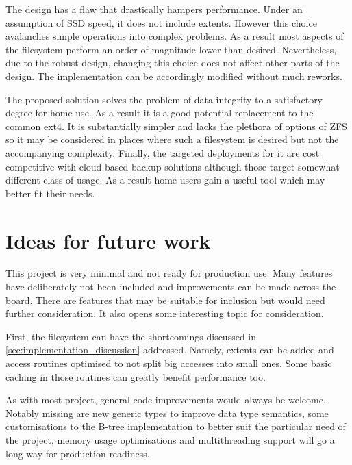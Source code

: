         The design has a flaw that drastically hampers performance. Under an
        assumption of SSD speed, it does not include extents. However this
        choice avalanches simple operations into complex problems. As a result
        most aspects of the filesystem perform an order of magnitude lower than
        desired. Nevertheless, due to the robust design, changing this choice
        does not affect other parts of the design. The implementation can be
        accordingly modified without much reworks.

        The proposed solution solves the problem of data integrity to a
        satisfactory degree for home use. As a result it is a good potential
        replacement to the common ext4. It is substantially simpler and lacks
        the plethora of options of ZFS so it may be considered in places where
        such a filesystem is desired but not the accompanying complexity.
        Finally, the targeted deployments for it are cost competitive with
        cloud based backup solutions although those target somewhat different
        class of usage. As a result home users gain a useful tool which may
        better fit their needs.

    \section{Ideas for future work}

        This project is very minimal and not ready for production use. Many
        features have deliberately not been included and improvements can be
        made across the board. There are features that may be suitable for
        inclusion but would need further consideration. It also opens some
        interesting topic for consideration.

        First, the filesystem can have the shortcomings discussed in
        \autoref{sec:implementation_discussion} addressed. Namely, extents can be
        added and access routines optimised to not split big accesses into
        small ones. Some basic caching in those routines can greatly benefit
        performance too.

        As with most project, general code improvements would always be
        welcome. Notably missing are new generic types to improve data type
        semantics, some customisations to the B-tree implementation to better
        suit the particular need of the project, memory usage optimisations
        and multithreading support will go a long way for production readiness.

